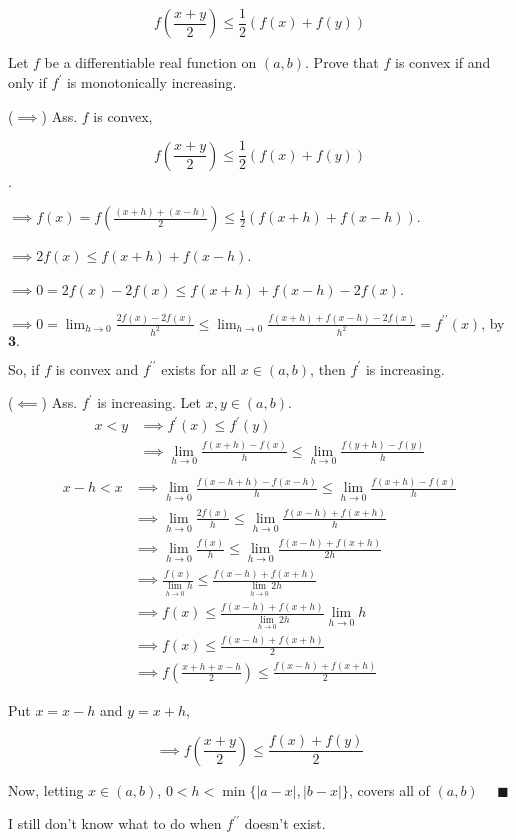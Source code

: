 \documentclass{article}
\begin{document}
\[f\left(\frac{x+y}{2}\right) \leq \frac{1}{2}(f(x)+f(y))\]

Let $f$ be a differentiable real function on $(a, b)$. Prove that $f$
is convex if and only if $f^\prime$
is monotonically increasing.


($\implies$) Ass. $f$ is convex,

\[f\left(\frac{x+y}{2}\right) \leq \frac{1}{2}(f(x)+f(y))\].

$\implies  f(x) = f\left(\frac{(x+h) + (x-h)}{2}\right)
\leq \frac{1}{2}(f(x+h)+f(x-h))$.

$\implies  2f(x) \leq f(x+h)+f(x-h)$.

$\implies  0 = 2f(x) - 2f(x) \leq f(x+h)+f(x-h) -2f(x)$.

$\implies  0 = \lim_{h\rightarrow 0} \frac{2f(x) - 2f(x)}{h^2} \leq
\lim_{h\rightarrow 0} \frac{ f(x+h)+f(x-h) -2f(x)}{h^2} =
f^{\prime\prime}(x)$, by $\mathbf{3}.$

So, if $f$ is convex and $f^{\prime\prime}$ exists for all
$x\in(a,b)$, then $f^\prime$ is increasing.

($\impliedby$) Ass. $f^{\prime}$ is increasing.
Let $x,y \in (a,b)$.
\begin{align*}
  x < y & \implies f^{\prime}(x)\leq f^{\prime}(y)\\
        & \implies   \lim_{h\rightarrow 0} \frac{f(x+h)-f(x)}{h}
          \leq\lim_{h\rightarrow 0} \frac{f(y+h)-f(y)}{h}\\
\end{align*}
\begin{align*}
  x -h < x & \implies   \lim_{h\rightarrow 0} \frac{f(x-h+h)-f(x-h)}{h}
             \leq\lim_{h\rightarrow 0} \frac{f(x+h)-f(x)}{h}\\
& \implies   \lim_{h\rightarrow 0} \frac{2f(x)}{h}
                                                                 \leq\lim_{h\rightarrow 0} \frac{f(x-h)+f(x+h)}{h}\\
  & \implies   \lim_{h\rightarrow 0} \frac{f(x)}{h}
    \leq\lim_{h\rightarrow 0} \frac{f(x-h)+f(x+h)}{2h}\\
  & \implies    \frac{f(x)}{\lim_{h\rightarrow 0} h}
    \leq \frac{f(x-h)+f(x+h)}{\lim_{h\rightarrow 0}2h}\\
  & \implies    f(x)
    \leq \frac{f(x-h)+f(x+h)}{\lim_{h\rightarrow
    0}2h}\lim_{h\rightarrow 0} h\\
           & \implies    f(x) \leq \frac{f(x-h)+f(x+h)}{2}\\
           & \implies    f\left(\frac{x+h +x-h}{2}\right) \leq \frac{f(x-h)+f(x+h)}{2}
\end{align*}

Put $x = x-h$ and $y = x+h$,

\[\implies    f\left(\frac{x + y}{2}\right) \leq \frac{f(x)+f(y)}{2}\]

Now, letting $x \in (a,b)$, $0<h<\min\{|a-x|,|b-x|\}$, covers all of $(a,b)\quad$
$\blacksquare$

I still don't know what to do when $f^{\prime\prime}$ doesn't exist.
\end{document}
